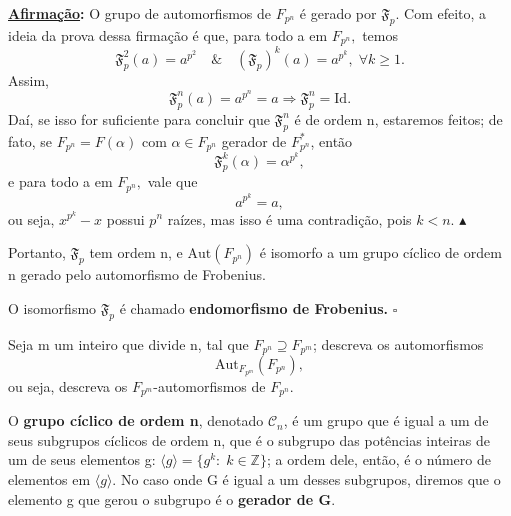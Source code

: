 \documentclass[../algebraIII_notes.tex]{subfiles}
\begin{document}
\begin{proof*}
	\textbf{\underline{Afirmação}:} O grupo de automorfismos de \(F_{p^{n}}\) é gerado por \(\mathfrak{F}_{p}\). Com efeito, a ideia da prova dessa firmação é que, para todo a em \(F_{p^{n}},\) temos
	\[
		\mathfrak{F}_{p}^{2}(a) = a^{p^{2}} \quad\&\quad (\mathfrak{F}_{p})^{k}(a) = a^{p^{k}},\; \forall k\geq 1.
	\]
	Assim,
	\[
		\mathfrak{F}_{p}^{n}(a) = a^{p^{n}} =a \Rightarrow \mathfrak{F}_{p}^{n} = \mathrm{Id}.
	\]
	Daí, se isso for suficiente para concluir que \(\mathfrak{F}_{p}^{n}\) é de ordem n, estaremos feitos; de fato, se \(F_{p^{n}}=F(\alpha )\) com \(\alpha \in F_{p^{n}}\) gerador de \(F_{p^{n}}^{*}\), então
	\[
		\mathfrak{F}_{p}^{k}(\alpha ) = \alpha^{p^{k}},
	\]
	e para todo a em \(F_{p^{n}},\) vale que
	\[
		a^{p^{k}}=a,
	\]
	ou seja, \(x^{p^{k}}-x\) possui \(p^{n}\) raízes, mas isso é uma contradição, pois \(k<n\). \(\blacktriangle\)

	Portanto, \(\mathfrak{F}_{p}\) tem ordem n, e \(\mathrm{Aut}(F_{p^{n}})\) é isomorfo a um grupo cíclico de ordem n gerado pelo automorfismo de Frobenius. \qedsymbol
\end{proof*}

\begin{def*}
	O isomorfismo \(\mathfrak{F}_{p}\) é chamado \textbf{endomorfismo de Frobenius.} \(\square\)
\end{def*}
\begin{exr}
	Seja m um inteiro que divide n, tal que \(F_{p^{n}}\supseteq F_{p^{m}}\); descreva os automorfismos
	\[
		\mathrm{Aut}_{F_{p^{m}}}(F_{p^{n}}),
	\]
	ou seja, descreva os \(F_{p^{m}}\)-automorfismos de \(F_{p^{n}}.\)
\end{exr}

\begin{tcolorbox}[
		skin=enhanced,
		title=Lembrete!,
		after title={\hfill Grupos Cíclicos},
		fonttitle=\bfseries,
		sharp corners=downhill,
		colframe=black,
		colbacktitle=yellow!75!white,
		colback=yellow!30,
		colbacklower=black,
		coltitle=black,
		drop large lifted shadow
	]
	O \hypertarget{cyclic_group}{\textbf{grupo cíclico de ordem n}}, denotado \(\mathcal{C}_{n}\), é um grupo que é igual a um de seus subgrupos cíclicos de ordem n, que é o subgrupo das potências inteiras de um de seus elementos g: \(\langle g \rangle = \{g^{k}:\; k\in \mathbb{Z}\}\); a ordem dele, então, é o número de elementos em \(\langle g \rangle\).
	No caso onde G é igual a um desses subgrupos, diremos que o elemento g que gerou o subgrupo é o \textbf{gerador de G}.
\end{tcolorbox}
\end{document}
